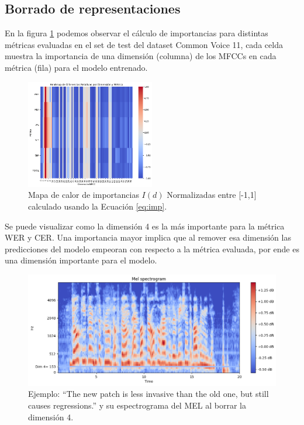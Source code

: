 \documentclass[conference]{IEEEtran}
\begin{document}
\subsection{Borrado de representaciones}

En la figura \ref{fig:cv_imp} podemos observar el cálculo de importancias para distintas métricas evaluadas en el set de test del dataset Common Voice 11, cada celda muestra la importancia de una dimensión (columna) de los MFCCs en cada métrica (fila) para el modelo entrenado.

\begin{figure}[ht]
\centering
\includegraphics[width=0.5\textwidth]{images/importance_plot_all_dims.png}
\caption{Mapa de calor de importancias $I(d)$ Normalizadas entre [-1,1] calculado usando la Ecuación \ref{eq:imp}.}
\label{fig:cv_imp}
\end{figure}

Se puede visualizar como la dimensión 4 es la más importante para la métrica WER y CER.
Una importancia mayor implica que al remover esa dimensión las predicciones del modelo empeoran con respecto a la métrica evaluada, por ende es una dimensión importante para el modelo.

\begin{figure}[ht]
\centering
\includegraphics[width=\textwidth]{images/dim_4_erasured.png}
\caption{Ejemplo: “The new patch is less invasive than the old one, but still causes regressions.” y su espectrograma del MEL al borrar la dimensión 4.}
\label{fig:mel_erasure_dim_4}
\end{figure}
\end{document}
